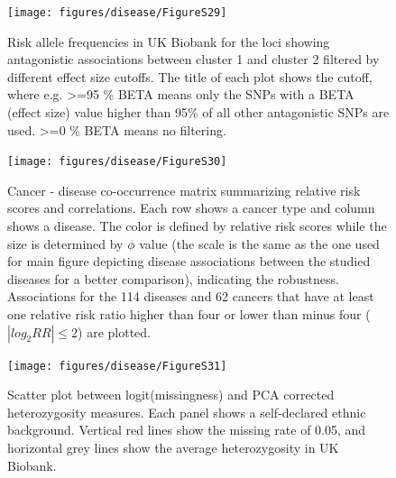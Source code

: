 \documentclass[12pt,twoside]{unicam}
\begin{document}
\begin{figure}

{\centering \texttt{[image: figures/disease/FigureS29]} 

}

\caption[Risk allele frequencies in UK Biobank for the loci showing antagonistic associations between cluster 1 and cluster 2 filtered by different effect size cutoffs.]{Risk allele frequencies in UK Biobank for the loci showing antagonistic associations between cluster 1 and cluster 2 filtered by different effect size cutoffs. The title of each plot shows the cutoff, where e.g. >=95 \% BETA means only the SNPs with a BETA (effect size) value higher than 95\% of all other antagonistic SNPs are used. >=0 \% BETA means no filtering.}\label{fig:disFigS29}
\end{figure}

\begin{figure}

{\centering \texttt{[image: figures/disease/FigureS30]} 

}

\caption[Cancer - disease co-occurrence matrix summarizing relative risk scores and correlations.]{Cancer - disease co-occurrence matrix summarizing relative risk scores and correlations. Each row shows a cancer type and column shows a disease. The color is defined by relative risk scores while the size is determined by $\phi$ value (the scale is the same as the one used for main figure depicting disease associations between the studied diseases for a better comparison), indicating the robustness. Associations for the 114 diseases and 62 cancers that have at least one relative risk ratio higher than four or lower than minus four ($|log_2RR| ≤ 2$) are plotted.}\label{fig:disFigS30}
\end{figure}

\begin{figure}

{\centering \texttt{[image: figures/disease/FigureS31]} 

}

\caption[Scatter plot between logit(missingness) and PCA corrected heterozygosity measures.]{Scatter plot between logit(missingness) and PCA corrected heterozygosity measures. Each panel shows a self-declared ethnic background. Vertical red lines show the missing rate of 0.05, and horizontal grey lines show the average heterozygosity in UK Biobank.}\label{fig:disFigS31}
\end{figure}
\end{document}
